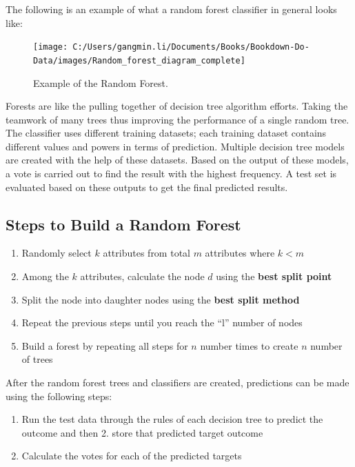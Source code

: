 \documentclass[
]{book}
\providecommand{\tightlist}{%
  \setlength{\itemsep}{0pt}\setlength{\parskip}{0pt}}
\begin{document}
The following is an example of what a random forest classifier in general looks like:

\begin{figure}

{\centering \texttt{[image: C:/Users/gangmin.li/Documents/Books/Bookdown-Do-Data/images/Random\_forest\_diagram\_complete]} 

}

\caption{Example of the Random Forest.}\label{fig:forest}
\end{figure}

Forests are like the pulling together of decision tree algorithm efforts. Taking the teamwork of many trees thus improving the performance of a single random tree. The classifier uses different training datasets; each training dataset contains different values and powers in terms of prediction. Multiple decision tree models are created with the help of these datasets. Based on the output of these models, a vote is carried out to find the result with the highest frequency. A test set is evaluated based on these outputs to get the final predicted results.

\hypertarget{steps-to-build-a-random-forest}{%
\subsection{Steps to Build a Random Forest}\label{steps-to-build-a-random-forest}}

\begin{enumerate}
\def\labelenumi{\arabic{enumi}.}
\tightlist
\item
  Randomly select \(k\) attributes from total \(m\) attributes where \(k < m\)
\item
  Among the \(k\) attributes, calculate the node \(d\) using the \textbf{best split point}
\item
  Split the node into daughter nodes using the \textbf{best split method}
\item
  Repeat the previous steps until you reach the ``l'' number of nodes
\item
  Build a forest by repeating all steps for \(n\) number times to create \(n\) number of trees
\end{enumerate}

After the random forest trees and classifiers are created, predictions can be made using the following steps:

\begin{enumerate}
\def\labelenumi{\arabic{enumi}.}
\tightlist
\item
  Run the test data through the rules of each decision tree to predict the outcome and then 2. store that predicted target outcome
\item
  Calculate the votes for each of the predicted targets
\end{enumerate}
\end{document}
